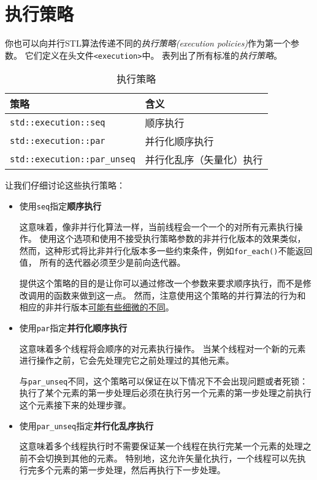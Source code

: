 \section{执行策略}\label{ch22.2}
你也可以向并行STL算法传递不同的\emph{执行策略(execution policies)}作为第一个参数。
它们定义在头文件\texttt{<execution>}中。
表列出了所有标准的\emph{执行策略}。
\begin{table}[ht]
    \centering
    \begin{tabular}{l|l}
        \hline
        \textbf{策略}                         & \textbf{含义}  \\
        \hline
        \texttt{std::execution::seq}        & 顺序执行         \\
        \texttt{std::execution::par}        & 并行化顺序执行      \\
        \texttt{std::execution::par\_unseq} & 并行化乱序（矢量化）执行 \\
        \hline
    \end{tabular}
    \caption{执行策略}
    \label{t22.1}
\end{table}

让我们仔细讨论这些执行策略：
\begin{itemize}
    \item 使用\texttt{seq}指定\textbf{顺序执行}

    这意味着，像非并行化算法一样，当前线程会一个一个的对所有元素执行操作。
    使用这个选项和使用不接受执行策略参数的非并行化版本的效果类似，
    然而，这种形式将比非并行化版本多一些约束条件，例如\texttt{for\_each()}不能返回值，
    所有的迭代器必须至少是前向迭代器。

    提供这个策略的目的是让你可以通过修改一个参数来要求顺序执行，而不是修改调用的函数来做到这一点。
    然而，注意使用这个策略的并行算法的行为和相应的非并行版本\hyperref[ch22.4]{可能有些细微的不同}。

    \item 使用\texttt{par}指定\textbf{并行化顺序执行}

    这意味着多个线程将会顺序的对元素执行操作。
    当某个线程对一个新的元素进行操作之前，它会先处理完它之前处理过的其他元素。

    与\texttt{par\_unseq}不同，这个策略可以保证在以下情况下不会出现问题或者死锁：
    执行了某个元素的第一步处理后必须在执行另一个元素的第一步处理之前执行这个元素接下来的处理步骤。
    \item 使用\texttt{par\_unseq}指定\textbf{并行化乱序执行}

    这意味着多个线程执行时不需要保证某一个线程在执行完某一个元素的处理之前不会切换到其他的元素。
    特别地，这允许矢量化执行，一个线程可以先执行完多个元素的第一步处理，然后再执行下一步处理。
\end{itemize}

